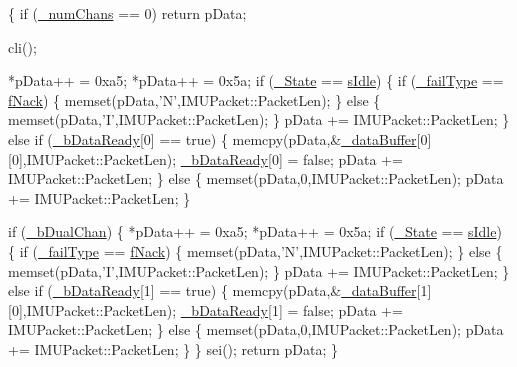 \begin{DoxyCode}
\{
    \textcolor{keywordflow}{if} (\hyperlink{class_i_m_u_a27df580b4559aaf3234469bfe16eb158}{_numChans} == 0) \textcolor{keywordflow}{return} pData;

    cli();

    *pData++ = 0xa5;
    *pData++ = 0x5a;
    \textcolor{keywordflow}{if} (\hyperlink{class_i_m_u_a2e3c70d02cc2b3dd98ce8153d02cf04e}{_State} == \hyperlink{class_i_m_u_a7b5e1bf1cf1407b3e4cf0dd2e18b523fa82181a217d68f26cba06b38cfb94c1bc}{sIdle}) \{
        \textcolor{keywordflow}{if} (\hyperlink{class_i_m_u_a39ed63b67b50c67520c5f8e5a2c26b26}{_failType} == \hyperlink{class_i_m_u_a4edeb07a848734657792b4ef8749fb97a17dff6c1392332855f9e83033dff49f8}{fNack}) \{
            memset(pData,\textcolor{charliteral}{'N'},IMUPacket::PacketLen);
        \} \textcolor{keywordflow}{else} \{
            memset(pData,\textcolor{charliteral}{'I'},IMUPacket::PacketLen);
        \}
        pData += IMUPacket::PacketLen;
    \} \textcolor{keywordflow}{else} \textcolor{keywordflow}{if} (\hyperlink{class_i_m_u_a8a71f0728b2d849d1d8e54fcb58aad4e}{_bDataReady}[0] == \textcolor{keyword}{true}) \{
        memcpy(pData,&\hyperlink{class_i_m_u_ab87a54288295d4d10d605cf6c21d4d0f}{_dataBuffer}[0][0],IMUPacket::PacketLen);
        \hyperlink{class_i_m_u_a8a71f0728b2d849d1d8e54fcb58aad4e}{_bDataReady}[0] = \textcolor{keyword}{false};
        pData += IMUPacket::PacketLen;
    \} \textcolor{keywordflow}{else} \{
        memset(pData,0,IMUPacket::PacketLen);
        pData += IMUPacket::PacketLen;
    \}

    \textcolor{keywordflow}{if} (\hyperlink{class_i_m_u_a62978e791838c3b4829e1d3d683e99b2}{_bDualChan}) \{
        *pData++ = 0xa5;
        *pData++ = 0x5a;
        \textcolor{keywordflow}{if} (\hyperlink{class_i_m_u_a2e3c70d02cc2b3dd98ce8153d02cf04e}{_State} == \hyperlink{class_i_m_u_a7b5e1bf1cf1407b3e4cf0dd2e18b523fa82181a217d68f26cba06b38cfb94c1bc}{sIdle}) \{
            \textcolor{keywordflow}{if} (\hyperlink{class_i_m_u_a39ed63b67b50c67520c5f8e5a2c26b26}{_failType} == \hyperlink{class_i_m_u_a4edeb07a848734657792b4ef8749fb97a17dff6c1392332855f9e83033dff49f8}{fNack}) \{
                memset(pData,\textcolor{charliteral}{'N'},IMUPacket::PacketLen);
            \} \textcolor{keywordflow}{else} \{
                memset(pData,\textcolor{charliteral}{'I'},IMUPacket::PacketLen);
            \}
            pData += IMUPacket::PacketLen;
        \} \textcolor{keywordflow}{else} \textcolor{keywordflow}{if} (\hyperlink{class_i_m_u_a8a71f0728b2d849d1d8e54fcb58aad4e}{_bDataReady}[1] == \textcolor{keyword}{true}) \{
            memcpy(pData,&\hyperlink{class_i_m_u_ab87a54288295d4d10d605cf6c21d4d0f}{_dataBuffer}[1][0],IMUPacket::PacketLen);
            \hyperlink{class_i_m_u_a8a71f0728b2d849d1d8e54fcb58aad4e}{_bDataReady}[1] = \textcolor{keyword}{false};
            pData += IMUPacket::PacketLen;
        \} \textcolor{keywordflow}{else} \{
            memset(pData,0,IMUPacket::PacketLen);
            pData += IMUPacket::PacketLen;
        \}
    \}
    sei();
    \textcolor{keywordflow}{return} pData;
\}
\end{DoxyCode}
